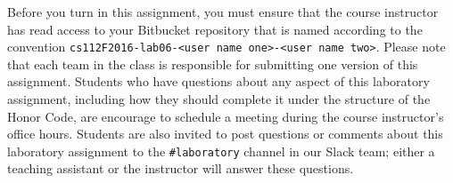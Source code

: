Before you turn in this assignment, you must ensure that the course instructor has read access to your Bitbucket
repository that is named according to the convention {\tt cs112F2016-lab06-<user name one>-<user name two>}. Please note
that each team in the class is responsible for submitting one version of this assignment. Students who have questions
about any aspect of this laboratory assignment, including how they should complete it under the structure of the Honor
Code, are encourage to schedule a meeting during the course instructor's office hours. Students are also invited to
post questions or comments about this laboratory assignment to the {\tt \#laboratory} channel in our Slack team; either
a teaching assistant or the instructor will answer these questions.


